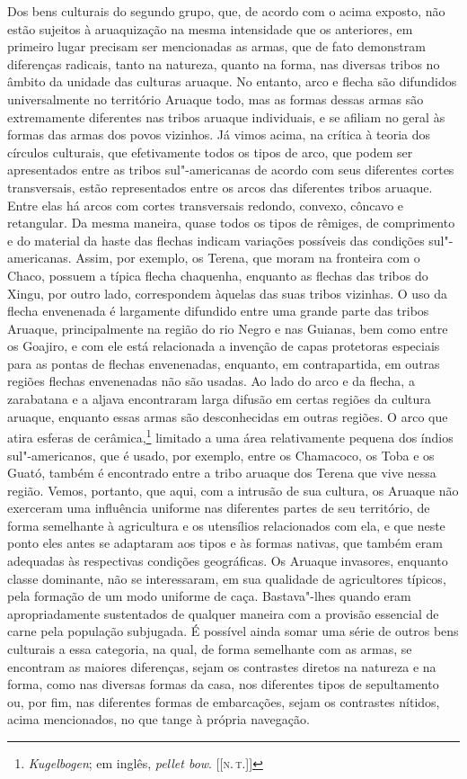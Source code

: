 Dos bens culturais do segundo grupo, que, de acordo com o acima exposto,
não estão sujeitos à aruaquização na mesma intensidade que os
anteriores, em primeiro lugar precisam ser mencionadas as armas, que de
fato demonstram diferenças radicais, tanto na natureza, quanto na
forma, nas diversas tribos no âmbito da unidade das culturas aruaque. No
entanto, arco e flecha são difundidos universalmente no território
Aruaque todo, mas as formas dessas armas são extremamente diferentes nas
tribos aruaque individuais, e se afiliam no geral às formas das armas
dos povos vizinhos. Já vimos acima, na crítica à teoria dos círculos
culturais, que efetivamente todos os tipos de arco, que podem ser
apresentados entre as tribos sul"-americanas de acordo com seus
diferentes cortes transversais, estão representados entre os arcos das
diferentes tribos aruaque. Entre elas há arcos com cortes transversais
redondo, convexo, côncavo e retangular. Da mesma maneira, quase todos
os tipos de rêmiges, de comprimento e do material da haste das flechas
indicam variações possíveis das condições sul"-americanas. Assim, por
exemplo, os Terena, que moram na fronteira com o Chaco, possuem a típica
flecha chaquenha, enquanto as flechas das tribos do Xingu, por outro
lado, correspondem àquelas das suas tribos vizinhas. O uso da flecha
envenenada é largamente difundido entre uma grande parte das tribos
Aruaque, principalmente na região do rio Negro e nas Guianas, bem como
entre os Goajiro, e com ele está relacionada a invenção de capas
protetoras especiais para as pontas de flechas envenenadas, enquanto,
em contrapartida, em outras regiões flechas envenenadas não são usadas.
Ao lado do arco e da flecha, a zarabatana e a aljava encontraram larga
difusão em certas regiões da cultura aruaque, enquanto essas armas são
desconhecidas em outras regiões. O arco que atira esferas de cerâmica,\footnote{
\textit{Kugelbogen}; em inglês, \textit{pellet bow}. {[}{[}\textsc{n.\,t.}{]}{]}} limitado a
uma área relativamente pequena dos índios sul"-americanos, que é usado,
por exemplo, entre os Chamacoco, os Toba e os Guató, também é encontrado
entre a tribo aruaque dos Terena que vive nessa região. Vemos, portanto,
que aqui, com a intrusão de sua cultura, os Aruaque não exerceram uma
influência uniforme nas diferentes partes de seu território, de forma
semelhante à agricultura e os utensílios relacionados com ela, e que
neste ponto eles antes se adaptaram aos tipos e às formas nativas, que
também eram adequadas às respectivas condições geográficas. Os Aruaque
invasores, enquanto classe dominante, não se interessaram, em sua
qualidade de agricultores típicos, pela formação de um modo uniforme de
caça. Bastava"-lhes quando eram apropriadamente sustentados de qualquer
maneira com a provisão essencial de carne pela população subjugada. É
possível ainda somar uma série de outros bens culturais a essa
categoria, na qual, de forma semelhante com as armas, se encontram as
maiores diferenças, sejam os contrastes diretos na natureza e na forma,
como nas diversas formas da casa, nos diferentes tipos de sepultamento
ou, por fim, nas diferentes formas de embarcações, sejam os contrastes
nítidos, acima mencionados, no que tange à própria navegação.

